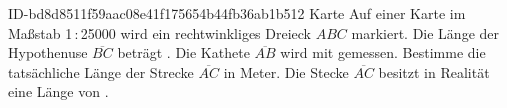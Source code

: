\begin{exercise}
      {ID-bd8d8511f59aac08e41f175654b44fb36ab1b512}
      {Karte}
  \ifproblem\problem
    Auf einer Karte im Maßstab 1\,:\,\num{25000} wird ein rechtwinkliges Dreieck
    $ABC$ markiert. Die Länge der Hypothenuse $\overline{BC}$ beträgt .
    Die Kathete $\overline{AB}$ wird mit  gemessen. Bestimme die
    tatsächliche Länge der Strecke $\overline{AC}$ in Meter.
  \fi
  \ifoutcome\outcome
    Die Stecke $\overline{AC}$ besitzt in Realität eine Länge von .
  \fi
\end{exercise}
